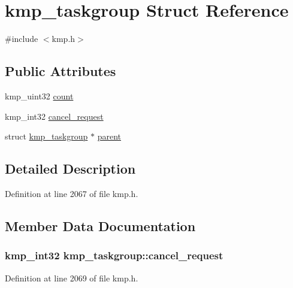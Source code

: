 \hypertarget{structkmp__taskgroup}{\section{kmp\-\_\-taskgroup Struct Reference}
\label{structkmp__taskgroup}
}


{\ttfamily \#include $<$kmp.\-h$>$}

\subsection*{Public Attributes}
\begin{DoxyCompactItemize}
\item 
kmp\-\_\-uint32 \hyperlink{structkmp__taskgroup_aa0ed4b8e5fd1730ebad7b0f3f3ebadf9}{count}
\item 
kmp\-\_\-int32 \hyperlink{structkmp__taskgroup_a0775c7306150a24b509b4f897be92bce}{cancel\-\_\-request}
\item 
struct \hyperlink{structkmp__taskgroup}{kmp\-\_\-taskgroup} $\ast$ \hyperlink{structkmp__taskgroup_acc9d4f642b6a421dcdc66e44baeca4af}{parent}
\end{DoxyCompactItemize}


\subsection{Detailed Description}


Definition at line 2067 of file kmp.\-h.



\subsection{Member Data Documentation}
\hypertarget{structkmp__taskgroup_a0775c7306150a24b509b4f897be92bce}{
\subsubsection[{cancel\-\_\-request}]{\setlength{\rightskip}{0pt plus 5cm}kmp\-\_\-int32 kmp\-\_\-taskgroup\-::cancel\-\_\-request}}\label{structkmp__taskgroup_a0775c7306150a24b509b4f897be92bce}


Definition at line 2069 of file kmp.\-h.



